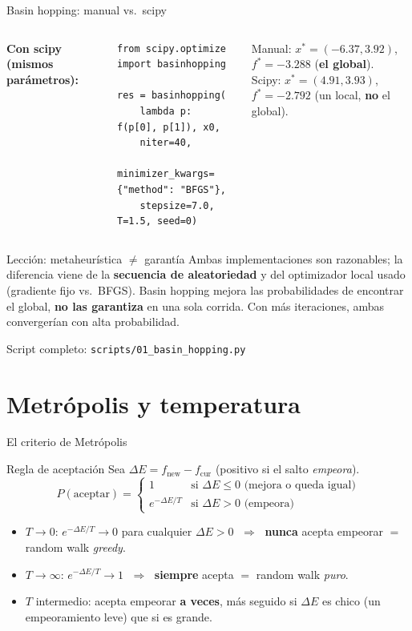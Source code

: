 \documentclass[aspectratio=169,10pt]{beamer}
\begin{document}
\begin{frame}[fragile]{Basin hopping: manual vs.\ scipy}
  \begin{columns}
    \textbf{Con scipy (mismos parámetros):}
\begin{lstlisting}
from scipy.optimize import basinhopping

res = basinhopping(
    lambda p: f(p[0], p[1]), x0,
    niter=40,
    minimizer_kwargs={"method": "BFGS"},
    stepsize=7.0, T=1.5, seed=0)
\end{lstlisting}
    \small Manual: $x^*=(-6.37,3.92)$, $f^*=-3.288$
    (\textbf{el global}). \\[4pt]
    Scipy: $x^*=(4.91,3.93)$, $f^*=-2.792$ (un
    local, \textbf{no} el global).
  \end{columns}
  \begin{alertblock}{Lección: metaheurística $\ne$ garantía}
    Ambas implementaciones son razonables; la diferencia viene de la
    \textbf{secuencia de aleatoriedad} y del optimizador local usado
    (gradiente fijo vs.\ BFGS). Basin hopping mejora las probabilidades
    de encontrar el global, \textbf{no las garantiza} en una sola corrida.
    Con más iteraciones, ambas convergerían con alta probabilidad.
  \end{alertblock}
  Script completo: \texttt{scripts/01\_basin\_hopping.py}
\end{frame}

\section{Metrópolis y temperatura}

\begin{frame}{El criterio de Metrópolis}
  \begin{block}{Regla de aceptación}
    Sea $\Delta E = f_{\text{new}} - f_{\text{cur}}$ (positivo si el
    salto \emph{empeora}).
    \[
      P(\text{aceptar}) =
      \begin{cases}
        1 & \text{si } \Delta E \le 0 \text{ (mejora o queda igual)} \\
        e^{-\Delta E / T} & \text{si } \Delta E > 0 \text{ (empeora)}
      \end{cases}
    \]
  \end{block}
  \begin{itemize}
    \item $T\to 0$: $e^{-\Delta E/T}\to 0$ para cualquier $\Delta E>0$
      $\;\Rightarrow\;$ \textbf{nunca} acepta empeorar $=$ random walk
      \emph{greedy}.
    \item $T\to\infty$: $e^{-\Delta E/T}\to 1$ $\;\Rightarrow\;$
      \textbf{siempre} acepta $=$ random walk \emph{puro}.
    \item $T$ intermedio: acepta empeorar \textbf{a veces}, más seguido
      si $\Delta E$ es chico (un empeoramiento leve) que si es grande.
  \end{itemize}
\end{frame}
\end{document}
